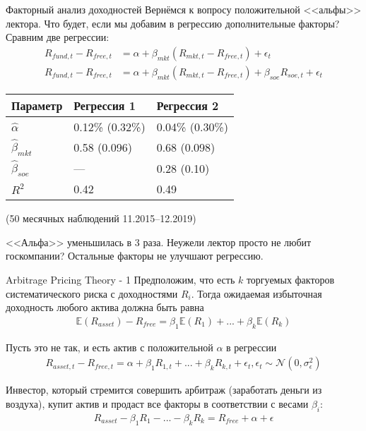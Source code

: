\documentclass{beamer}
\begin{document}
\begin{frame}{Факторный анализ доходностей}
\justify
Вернёмся к вопросу положительной <<альфы>> лектора. Что будет, если мы добавим в регрессию дополнительные факторы? Сравним две регрессии:
\begin{align*}
R_{fund,t} - R_{free,t} &= \alpha + \beta_{mkt}(R_{mkt,t} - R_{free,t}) + \epsilon_t
\\
R_{fund,t} - R_{free,t} &= \alpha + \beta_{mkt}(R_{mkt,t} - R_{free,t}) + \beta_{soe}R_{soe,t} + \epsilon_t
\end{align*}

\centering
\begin{tabular}{l|l|l}
Параметр            & Регрессия 1                   & Регрессия 2 \\ \hline
$\hat{\alpha}$      & 0.12\% {\scriptsize (0.32\%)} & 0.04\% {\scriptsize (0.30\%)} \\
$\hat{\beta}_{mkt}$ & 0.58 {\scriptsize (0.096)}    & 0.68 {\scriptsize (0.098)} \\
$\hat{\beta}_{soe}$ & ---                           & 0.28 {\scriptsize (0.10)} \\
$R^2$               & 0.42                          & 0.49 \\ \hline
\end{tabular}

{\scriptsize (50 месячных наблюдений 11.2015--12.2019)}

\justify
<<Альфа>> уменьшилась в 3 раза. Неужели лектор просто не любит госкомпании? Остальные факторы не улучшают регрессию.


\end{frame}



\begin{frame}{Arbitrage Pricing Theory - 1}
\justify
Предположим, что есть $k$ торгуемых факторов систематического риска с доходностями $R_i$. Тогда ожидаемая избыточная доходность любого актива должна быть равна
\begin{align*}
\mathbb{E}(R_{asset}) - R_{free} = \beta_1\mathbb{E}(R_1) + ... + \beta_k\mathbb{E}(R_k)
\end{align*}

Пусть это не так, и есть актив с положительной $\alpha$ в регрессии
\begin{align*}
R_{asset,t} - R_{free,t} = \alpha + \beta_1R_{1,t} + ... + \beta_kR_{k,t} + \epsilon_t, \epsilon_t \sim \mathcal{N}(0, \sigma_{\epsilon}^2)
\end{align*}

Инвестор, который стремится совершить арбитраж (заработать деньги из воздуха), купит актив и продаст все факторы в соответствии с весами $\beta_i$:
\begin{align*}
R_{asset} - \beta_1 R_{1} - ... - \beta_k R_k = R_{free} + \alpha + \epsilon
\end{align*}
\end{frame}
\end{document}
